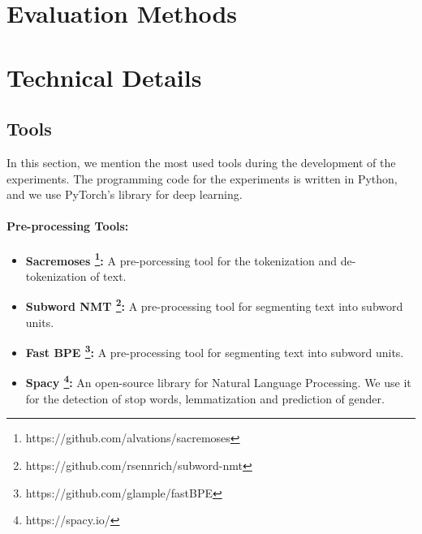 
\section{Evaluation Methods}
\label{sec:Setup:Evaluation}



\section{Technical Details}
\label{sec:Setup:Technical}

\subsection{Tools}
\label{sec:Experiments:Tools}

In this section, we mention the most used tools during the development of the experiments. The programming code for the experiments is written in Python, and we use PyTorch's library for deep learning.

\paragraph{Pre-processing Tools:}
\begin{itemize}
    \item \textbf{Sacremoses \footnote{https://github.com/alvations/sacremoses}:} A pre-porcessing tool for the tokenization and de-tokenization of text.
    \item \textbf{Subword NMT \footnote{https://github.com/rsennrich/subword-nmt}:} A pre-processing tool for segmenting text into subword units. %
    \item \textbf{Fast BPE \footnote{https://github.com/glample/fastBPE}:} A pre-processing tool for segmenting text into subword units. %
    \item \textbf{Spacy \footnote{https://spacy.io/}:} An open-source library for Natural Language Processing. We use it for the detection of stop words, lemmatization and prediction of gender.
\end{itemize}

